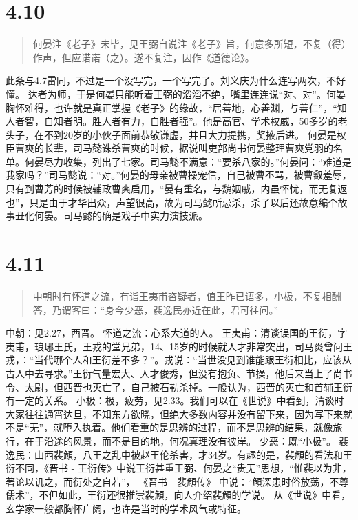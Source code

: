 \documentclass[]{book}
\begin{document}
\section{4.10}\label{section-189}

\begin{quote}
何晏注《老子》未毕，见王弼自说注《老子》旨，何意多所短，不复（得）作声，但应诺诺（之）。遂不复注，因作《道德论》。
\end{quote}

此条与4.7雷同，不过是一个没写完，一个写完了。刘义庆为什么连写两次，不好懂。
达者为师，于是何晏只能听着王弼的滔滔不绝，嘴里连连说``对、对''。何晏胸怀难得，也许就是真正掌握《老子》的缘故，``居善地，心善渊，与善仁''，``知人者智，自知者明。胜人者有力，自胜者强''。他是高官、学术权威，50多岁的老头子，在不到20岁的小伙子面前恭敬谦虚，并且大力提携，奖掖后进。
何晏是权臣曹爽的长辈，司马懿诛杀曹爽的时候，据说叫吏部尚书何晏整理曹爽党羽的名单。何晏尽力收集，列出了七家。司马懿不满意：``要杀八家的。''何晏问：``难道是我家吗？''司马懿说：``对。''何晏的母亲被曹操宠信，自己被曹丕骂，被曹叡羞辱，只有到曹芳的时候被辅政曹爽启用，``晏有重名，与魏姻戚，内虽怀忧，而无复返也''，只是由于才华出众，声望很高，故为司马懿所忌杀，杀了以后还故意编个故事丑化何晏。司马懿的确是戏子中实力演技派。

\section{4.11}\label{section-190}

\begin{quote}
中朝时有怀道之流，有诣王夷甫咨疑者，值王昨已语多，小极，不复相酬答，乃谓客曰：``身今少恶，裴逸民亦近在此，君可往问。''
\end{quote}

中朝：见2.27，西晋。 怀道之流：心系大道的人。
王夷甫：清谈误国的王衍，字夷甫，琅琊王氏，王戎的堂兄弟，14、15岁的时候就人才非常突出，司马炎曾问王戎，：``当代哪个人和王衍差不多？''。戎说：``当世没见到谁能跟王衍相比，应该从古人中去寻求。''王衍气量宏大、人才俊秀，但没有抱负、节操，他后来当上了尚书令、太尉，但西晋也灭亡了，自己被石勒杀掉。一般认为，西晋的灭亡和首辅王衍有一定的关系。
小极：极，疲劳，见2.33。我们可以在《世说》中看到，清谈时大家往往通宵达旦，不知东方欲晓，但绝大多数内容并没有留下来，因为写下来就不是``无''，就堕入执着。他们看重的是思辨的过程，而不是思辨的结果，就像旅行，在于沿途的风景，而不是目的地，何况真理没有彼岸。
少恶：既``小极''。
裴逸民：山西裴頠，八王之乱中被赵王伦杀害，才34岁。有趣的是，裴頠的看法和王衍不同，《晋书
-
王衍传》中说王衍甚重王弼、何晏之``贵无''思想，``惟裴以为非，著论以讥之，而衍处之自若''，
《晋书 - 裴頠传》
中说：``頠深患时俗放荡，不尊儒术''，不但如此，王衍还很推崇裴頠，向人介绍裴頠的学说。
从《世说》中看，玄学家一般都胸怀广阔，也许是当时的学术风气或特征。
\end{document}

